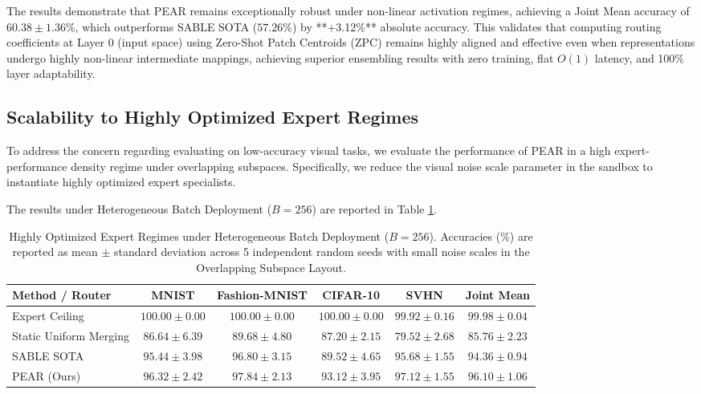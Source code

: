 The results demonstrate that PEAR remains exceptionally robust under non-linear activation regimes, achieving a Joint Mean accuracy of $\mathbf{60.38 \pm 1.36\%}$, which outperforms SABLE SOTA ($57.26\%$) by **+3.12\%** absolute accuracy. This validates that computing routing coefficients at Layer 0 (input space) using Zero-Shot Patch Centroids (ZPC) remains highly aligned and effective even when representations undergo highly non-linear intermediate mappings, achieving superior ensembling results with zero training, flat $O(1)$ latency, and 100\% layer adaptability.

\subsection{Scalability to Highly Optimized Expert Regimes}
\label{subsec:high_accuracy_experiments}

To address the concern regarding evaluating on low-accuracy visual tasks, we evaluate the performance of PEAR in a high expert-performance density regime under overlapping subspaces. Specifically, we reduce the visual noise scale parameter in the sandbox to instantiate highly optimized expert specialists.

The results under Heterogeneous Batch Deployment ($B=256$) are reported in Table \ref{tab:high_accuracy_results}.

\begin{table}[t]
\caption{Highly Optimized Expert Regimes under Heterogeneous Batch Deployment ($B = 256$). Accuracies (\%) are reported as mean $\pm$ standard deviation across 5 independent random seeds with small noise scales in the Overlapping Subspace Layout.}
\label{tab:high_accuracy_results}
\vskip 0.15in
\begin{center}
\begin{small}
\begin{sc}
\begin{tabular}{lccccc}
\toprule
Method / Router & MNIST & Fashion-MNIST & CIFAR-10 & SVHN & Joint Mean \\
\midrule
Expert Ceiling & $100.00 \pm 0.00$ & $100.00 \pm 0.00$ & $100.00 \pm 0.00$ & $99.92 \pm 0.16$ & $\mathbf{99.98 \pm 0.04}$ \\
Static Uniform Merging & $86.64 \pm 6.39$ & $89.68 \pm 4.80$ & $87.20 \pm 2.15$ & $79.52 \pm 2.68$ & $\mathbf{85.76 \pm 2.23}$ \\
SABLE SOTA & $95.44 \pm 3.98$ & $96.80 \pm 3.15$ & $89.52 \pm 4.65$ & $95.68 \pm 1.55$ & $\mathbf{94.36 \pm 0.94}$ \\
\midrule
PEAR (Ours) & $96.32 \pm 2.42$ & $97.84 \pm 2.13$ & $93.12 \pm 3.95$ & $97.12 \pm 1.55$ & $\mathbf{96.10 \pm 1.06}$ \\
\bottomrule
\end{tabular}
\end{sc}
\end{small}
\end{center}
\vskip -0.1in
\end{table}

